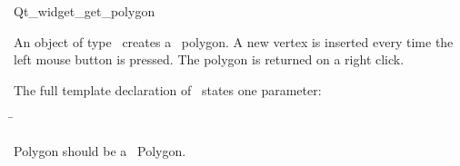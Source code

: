 
\begin{ccRefClass}{Qt_widget_get_polygon}

\ccDefinition
An object of type \ccRefName\ creates a \cgal\ polygon. A new 
vertex is inserted every time the left mouse button is pressed.
The polygon is returned on a right click.


\ccParameters

The full template declaration of \ccClassTemplateName\ states one parameter:

\begin{tabbing}
 \=\\
\end{tabbing}

Polygon should be a \cgal\ Polygon.

\ccInheritsFrom
{}

\ccGlue

\ccCreation
{}


\end{ccRefClass}









